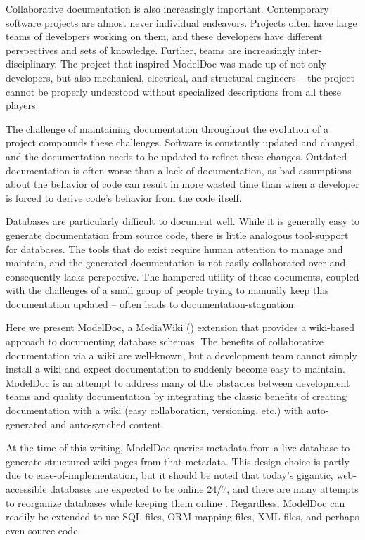 \documentclass{acm_proc_article-sp}
\begin{document}
Collaborative documentation is also increasingly important. 
Contemporary software projects are almost never individual endeavors. Projects
often have large teams of developers working on them, and these developers have
different perspectives and sets of knowledge.  Further, teams are increasingly
inter-disciplinary.  The project that inspired ModelDoc was made up of not only
developers, but also mechanical, electrical, and structural engineers -- the project cannot be properly
understood without specialized descriptions from all these players.

The challenge of maintaining documentation throughout the evolution of a
project compounds these challenges.  Software is constantly updated and
changed, and the documentation needs to be updated to reflect these changes.
 Outdated documentation is often worse than a lack of documentation, as bad
assumptions about the behavior of code can result in more wasted time than
when a developer is forced to derive code's behavior from the code itself.

Databases are particularly difficult to document well.  While it is generally
easy to generate documentation from source code, there is little analogous
tool-support for databases.  The tools that do exist require human attention to
manage and maintain, and the generated documentation is not easily collaborated
over and consequently lacks perspective. The hampered utility of these
documents, coupled with the challenges of a small group of people trying to
manually keep this documentation updated -- often leads to
documentation-stagnation.

Here we present ModelDoc, a MediaWiki (\cite{web:mediawiki}) extension that
provides a wiki-based approach to documenting database schemas.  The benefits of collaborative
documentation via a wiki are well-known, but a development team cannot simply install a wiki
and expect documentation to suddenly become easy to maintain.  ModelDoc is an
attempt to address many of the obstacles between development teams and quality
documentation by integrating the classic benefits of creating documentation
with a wiki (easy collaboration, versioning, etc.) with auto-generated and
auto-synched content.

At the time of this writing, ModelDoc queries metadata from a live database to
generate structured wiki pages from that metadata.  This design choice is
partly due to ease-of-implementation, but it should be noted that today's
gigantic, web-accessible databases are expected to be online 24/7, and there
are many attempts to reorganize databases while keeping them online
\cite{sockut:reorganization} \cite{curino:evolution}.  Regardless, ModelDoc can
readily be extended to use SQL files, ORM mapping-files, XML files, and perhaps
even source code.
\end{document}
